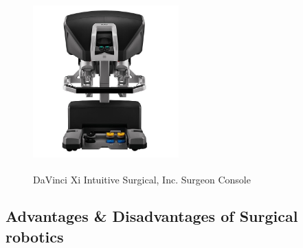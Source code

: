 \begin{center}
\begin{figure}[!htb]
\centering
\includegraphics[width=0.5\textwidth]{images/intuitive-davinci-console-front-lowres.jpg}\\
\caption[DaVinci Xi \textsuperscript {} Intuitive Surgical, Inc. Surgeon Console]{DaVinci Xi \textsuperscript {} Intuitive Surgical, Inc. Surgeon Console \footnotemark}
\end{figure}
\end{center}


\subsection{Advantages \& Disadvantages of Surgical robotics}

